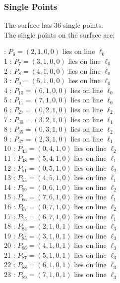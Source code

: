 \documentclass{article}
\begin{document}
{\subsubsection*{Single Points}
The surface has 36 single points:\\
The single points on the surface are:\\
\begin{multicols}{2}
 : $P_{6}=( 2, 1, 0, 0 )$ lies on line $\ell_{0}$\\
1 : $P_{7}=( 3, 1, 0, 0 )$ lies on line $\ell_{0}$\\
2 : $P_{8}=( 4, 1, 0, 0 )$ lies on line $\ell_{0}$\\
3 : $P_{9}=( 5, 1, 0, 0 )$ lies on line $\ell_{0}$\\
4 : $P_{10}=( 6, 1, 0, 0 )$ lies on line $\ell_{0}$\\
5 : $P_{11}=( 7, 1, 0, 0 )$ lies on line $\ell_{0}$\\
6 : $P_{27}=( 0, 2, 1, 0 )$ lies on line $\ell_{2}$\\
7 : $P_{30}=( 3, 2, 1, 0 )$ lies on line $\ell_{1}$\\
8 : $P_{35}=( 0, 3, 1, 0 )$ lies on line $\ell_{2}$\\
9 : $P_{37}=( 2, 3, 1, 0 )$ lies on line $\ell_{1}$\\
10 : $P_{43}=( 0, 4, 1, 0 )$ lies on line $\ell_{2}$\\
11 : $P_{48}=( 5, 4, 1, 0 )$ lies on line $\ell_{1}$\\
12 : $P_{51}=( 0, 5, 1, 0 )$ lies on line $\ell_{2}$\\
13 : $P_{55}=( 4, 5, 1, 0 )$ lies on line $\ell_{1}$\\
14 : $P_{59}=( 0, 6, 1, 0 )$ lies on line $\ell_{2}$\\
15 : $P_{66}=( 7, 6, 1, 0 )$ lies on line $\ell_{1}$\\
16 : $P_{67}=( 0, 7, 1, 0 )$ lies on line $\ell_{2}$\\
17 : $P_{73}=( 6, 7, 1, 0 )$ lies on line $\ell_{1}$\\
18 : $P_{84}=( 2, 1, 0, 1 )$ lies on line $\ell_{3}$\\
19 : $P_{85}=( 3, 1, 0, 1 )$ lies on line $\ell_{3}$\\
20 : $P_{86}=( 4, 1, 0, 1 )$ lies on line $\ell_{3}$\\
21 : $P_{87}=( 5, 1, 0, 1 )$ lies on line $\ell_{3}$\\
22 : $P_{88}=( 6, 1, 0, 1 )$ lies on line $\ell_{3}$\\
23 : $P_{89}=( 7, 1, 0, 1 )$ lies on line $\ell_{3}$\\

\end{multicols}}
\end{document}
